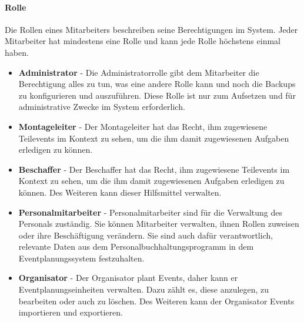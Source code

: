 \paragraph{Rolle}
Die Rollen eines Mitarbeiters beschreiben seine Berechtigungen im System. Jeder Mitarbeiter hat mindestens eine Rolle und kann jede Rolle höchstens einmal haben. 
\begin{itemize}
    \item \textbf{Administrator} - Die Administratorrolle gibt dem Mitarbeiter die Berechtigung alles zu tun, was eine andere Rolle kann und noch die Backups zu konfigurieren und auszuführen. Diese Rolle ist nur zum Aufsetzen und für administrative Zwecke im System erforderlich.
    \item \textbf{Montageleiter} - Der Montageleiter hat das Recht, ihm zugewiesene Teilevents im Kontext zu sehen, um die ihm damit zugewiesenen Aufgaben erledigen zu können.
    \item \textbf{Beschaffer} - Der Beschaffer hat das Recht, ihm zugewiesene Teilevents im Kontext zu sehen, um die ihm damit zugewiesenen Aufgaben erledigen zu können. Des Weiteren kann dieser Hilfsmittel verwalten.
    \item \textbf{Personalmitarbeiter} - Personalmitarbeiter sind für die Verwaltung des Personals zuständig. Sie können Mitarbeiter verwalten, ihnen Rollen zuweisen oder ihre Beschäftigung verändern. Sie sind auch dafür verantwortlich, relevante Daten aus dem Personalbuchhaltungsprogramm in dem Eventplanungssystem festzuhalten.
    \item \textbf{Organisator} - Der Organisator plant Events, daher kann er Eventplanungseinheiten verwalten. Dazu zählt es, diese anzulegen, zu bearbeiten oder auch zu löschen. Des Weiteren kann der Organisator Events importieren und exportieren.
\end{itemize}


